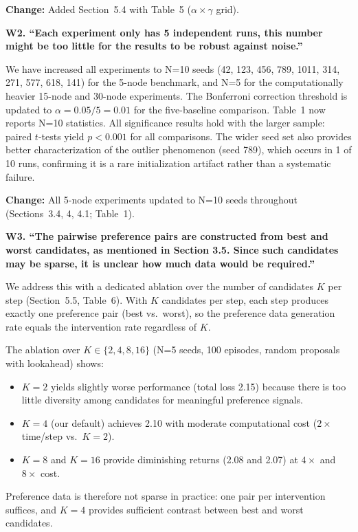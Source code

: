 \documentclass[11pt]{article}
\newcommand{\reviewer}[1]{\vspace{0.8em}\noindent\textbf{\textcolor{reviewercolor}{#1}}}
\newcommand{\response}{\vspace{0.3em}\noindent\textcolor{responsecolor}}
\newcommand{\change}[1]{\textcolor{changecolor}{\textbf{Change:} #1}}
\begin{document}
\change{Added Section~5.4 with Table~5 ($\alpha \times \gamma$ grid).}

\reviewer{W2. ``Each experiment only has 5 independent runs, this number might be too little for the results to be robust against noise.''}

\response We have increased all experiments to N=10 seeds (42, 123, 456, 789, 1011, 314, 271, 577, 618, 141) for the 5-node benchmark, and N=5 for the computationally heavier 15-node and 30-node experiments. The Bonferroni correction threshold is updated to $\alpha = 0.05/5 = 0.01$ for the five-baseline comparison. Table~1 now reports N=10 statistics. All significance results hold with the larger sample: paired $t$-tests yield $p < 0.001$ for all comparisons. The wider seed set also provides better characterization of the outlier phenomenon (seed 789), which occurs in 1 of 10 runs, confirming it is a rare initialization artifact rather than a systematic failure.

\change{All 5-node experiments updated to N=10 seeds throughout (Sections~3.4, 4, 4.1; Table~1).}

\reviewer{W3. ``The pairwise preference pairs are constructed from best and worst candidates, as mentioned in Section 3.5. Since such candidates may be sparse, it is unclear how much data would be required.''}

\response We address this with a dedicated ablation over the number of candidates $K$ per step (Section~5.5, Table~6). With $K$ candidates per step, each step produces exactly one preference pair (best vs.\ worst), so the preference data generation rate equals the intervention rate regardless of $K$.

The ablation over $K \in \{2, 4, 8, 16\}$ (N=5 seeds, 100 episodes, random proposals with lookahead) shows:
\begin{itemize}[nosep]
\item $K=2$ yields slightly worse performance (total loss 2.15) because there is too little diversity among candidates for meaningful preference signals.
\item $K=4$ (our default) achieves 2.10 with moderate computational cost ($2\times$ time/step vs.\ $K=2$).
\item $K=8$ and $K=16$ provide diminishing returns (2.08 and 2.07) at $4\times$ and $8\times$ cost.
\end{itemize}

Preference data is therefore not sparse in practice: one pair per intervention suffices, and $K=4$ provides sufficient contrast between best and worst candidates.
\end{document}
